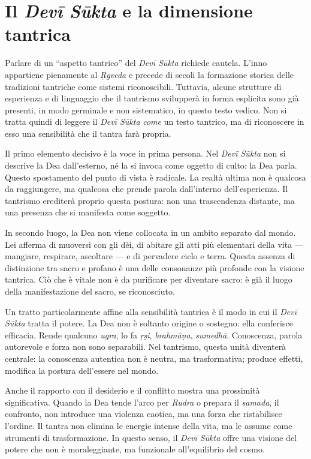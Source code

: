 \chapter*{Il \textit{Devī Sūkta }e la dimensione tantrica}

Parlare di un “aspetto tantrico” del \textit{Devī Sūkta} richiede cautela. L’inno appartiene pienamente al \textit{Ṛgveda} e precede di secoli la formazione storica delle tradizioni tantriche come sistemi riconoscibili. Tuttavia, alcune strutture di esperienza e di linguaggio che il tantrismo svilupperà in forma esplicita sono già presenti, in modo germinale e non sistematico, in questo testo vedico. Non si tratta quindi di leggere il \textit{Devī Sūkta} \emph{come} un testo tantrico, ma di riconoscere in esso una sensibilità che il tantra farà propria.

Il primo elemento decisivo è la voce in prima persona. Nel \textit{Devī Sūkta} non si descrive la Dea dall’esterno, né la si invoca come oggetto di culto: la Dea parla. Questo spostamento del punto di vista è radicale. La realtà ultima non è qualcosa da raggiungere, ma qualcosa che prende parola dall’interno dell’esperienza. Il tantrismo erediterà proprio questa postura: non una trascendenza distante, ma una presenza che si manifesta come soggetto.

In secondo luogo, la Dea non viene collocata in un ambito separato dal mondo. Lei afferma di muoversi con gli dèi, di abitare gli atti più elementari della vita — mangiare, respirare, ascoltare — e di pervadere cielo e terra. Questa assenza di distinzione tra sacro e profano è una delle consonanze più profonde con la visione tantrica. Ciò che è vitale non è da purificare per diventare sacro: è già il luogo della manifestazione del sacro, se riconosciuto.

Un tratto particolarmente affine alla sensibilità tantrica è il modo in cui il \textit{Devī Sūkta }tratta il potere. La Dea non è soltanto origine o sostegno: ella conferisce efficacia. Rende qualcuno \textit{ugra}, lo fa \textit{ṛṣi}, \textit{brahmāṇa}, \textit{sumedhā}. Conoscenza, parola autorevole e forza non sono separabili. Nel tantrismo, questa unità diventerà centrale: la conoscenza autentica non è neutra, ma trasformativa; produce effetti, modifica la postura dell’essere nel mondo.

Anche il rapporto con il desiderio e il conflitto mostra una prossimità significativa. Quando la Dea tende l’arco per \textit{Rudra} o prepara il \textit{samada}, il confronto, non introduce una violenza caotica, ma una forza che ristabilisce l’ordine. Il tantra non elimina le energie intense della vita, ma le assume come strumenti di trasformazione. In questo senso, il \textit{Devī Sūkta} offre una visione del potere che non è moraleggiante, ma funzionale all’equilibrio del cosmo.

